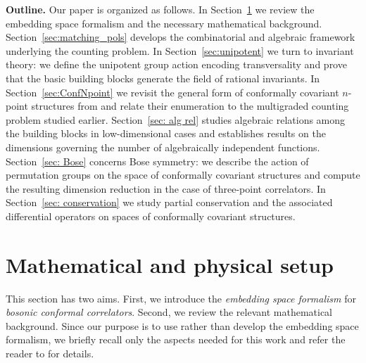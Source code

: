 \documentclass[12pt,a4paper]{extarticle}
\theoremstyle{definition}
\begin{document}
\medskip

\noindent\textbf{Outline.} Our paper is organized as follows. In Section~\ref{sec: preliminaries} we review the embedding space formalism and the necessary mathematical background. Section~\ref{sec:matching_pols} develops the combinatorial and algebraic framework underlying the counting problem. In Section~\ref{sec:unipotent} we turn to invariant theory: we define the unipotent group action encoding transversality and prove that the basic building blocks generate the field of rational invariants. In Section~\ref{sec:ConfNpoint} we revisit the general form of conformally covariant $n$-point structures from \cite{CPPR} and relate their enumeration to the multigraded counting problem studied earlier.
Section~\ref{sec: alg rel} studies algebraic relations among the building blocks in low-dimensional cases and establishes results on the dimensions governing the number of algebraically independent functions. Section~\ref{sec: Bose} concerns Bose symmetry: we describe the action of permutation groups on the space of conformally covariant structures and compute the resulting dimension reduction in the case of three-point correlators. In Section~\ref{sec: conservation} we study partial conservation and the associated differential operators on spaces of conformally covariant structures.

\section{Mathematical and physical setup}\label{sec: preliminaries}
This section has two aims. First, we introduce the \textit{embedding space formalism} for \textit{bosonic conformal correlators}. Second, we review the relevant mathematical background. 
Since our purpose is to use rather than develop the embedding space formalism, we briefly recall only the aspects needed for this work and refer the reader to \cite{CPPR,Dirac,FGG2,FGG,MackSalam,Weinberg} for %
details.

\medskip
\end{document}
